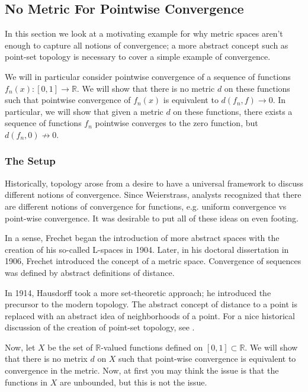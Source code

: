 \subsection{No Metric For Pointwise Convergence}

In this section we look at a motivating example for why metric spaces aren't enough to capture all notions
of convergence; a more abstract concept such as point-set topology is necessary to cover a simple example of convergence.

We will in particular consider pointwise convergence of a sequence of functions \(f_n(x) : [0, 1] \to \mathbb R\).
We will show that there is no metric \(d\) on these functions such that pointwise convergence of \(f_n(x)\) is
equivalent to \(d(f_n, f) \to 0\). In particular, we will show that given a metric \(d\) on these functions, there
exists a sequence of functions \(f_n\) pointwise converges to the zero function, but \(d(f_n, 0) \not \to 0\).

\subsubsection*{The Setup}

Historically, topology arose from a desire to have a universal framework to discuss different notions of convergence.
Since Weierstrass, analysts recognized that there are different notions of convergence for functions, e.g. uniform
convergence vs point-wise convergence. It was desirable to put all of these ideas on even footing.

In a sense, Frechet began the introduction of more abstract spaces with the creation of his so-called L-spaces in 1904. 
Later, in his doctoral dissertation in 1906, Frechet introduced the concept of a metric space. Convergence of
sequences was defined by abstract definitions of distance.

In 1914, Hausdorff took a more set-theoretic approach; he introduced the precursor to the modern topology. The abstract
concept of distance to a point is replaced with an abstract idea of neighborhoods of a point. For a nice historical
discussion of the creation of point-set topology, see \cite{mooreTopology}.

Now, let \(X\) be the set of \(\mathbb R\)-valued functions defined on \([0,1] \subset \mathbb R\). We will show that
there is no metrix \(d\) on \(X\) such that point-wise convergence is equivalent to convergence in the metric. Now,
at first you may think the issue is that the functions in \(X\) are unbounded, but this is not the issue. 

